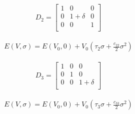 \begin{center}
\begin{minipage}{.35\textwidth}
  \begin{equation}
    \begin{split}
      D_{2} = 
      \begin{bmatrix}
      1          & 0           & 0             \\
      0          & 1 + \delta  & 0             \\
      0          & 0           & 1             \\
      \end{bmatrix}
    \end{split}
  \label{eq:distortion2}
  \end{equation}
\end{minipage}
\begin{minipage}{.10\textwidth}
\end{minipage}
\begin{minipage}{.54\textwidth}
  \begin{equation}
    \begin{split}
    E(V,\sigma) = E(V_{0},0) + V_{0} \left( \tau_{2} \sigma + \frac{c_{22}}{2} \sigma^2 \right)
    \end{split}
  \label{eq:distortion2energy}
  \end{equation}
\end{minipage}
\end{center}


\begin{center}
\begin{minipage}{.35\textwidth}
  \begin{equation}
    \begin{split}
      D_{3} = 
      \begin{bmatrix}
      1          & 0           & 0             \\
      0          & 1           & 0             \\
      0          & 0           & 1 + \delta    \\
      \end{bmatrix}
    \end{split}
  \label{eq:distortion3}
  \end{equation}
\end{minipage}
\begin{minipage}{.10\textwidth}
\end{minipage}
\begin{minipage}{.54\textwidth}
  \begin{equation}
    \begin{split}
    E(V,\sigma) = E(V_{0},0) + V_{0} \left( \tau_{3} \sigma + \frac{c_{33}}{2} \sigma^2 \right)
    \end{split}
  \label{eq:distortion3energy}
  \end{equation}
\end{minipage}
\end{center}

